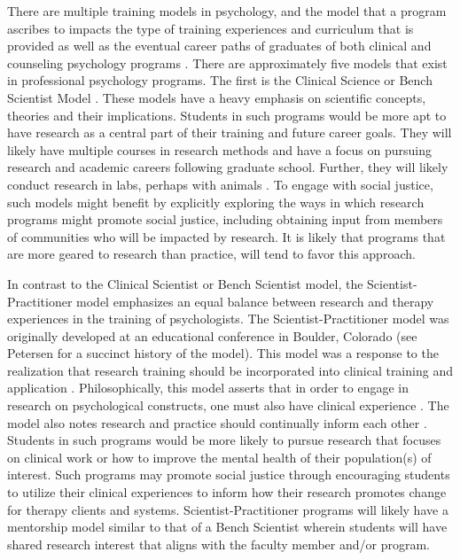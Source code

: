 \documentclass[
  11pt,
]{book}
\begin{document}
There are multiple training models in psychology, and the model that a program ascribes to impacts the type of training experiences and curriculum that is provided as well as the eventual career paths of graduates of both clinical \citep{cherry_examination_2000} and counseling psychology programs \citep{neimeyer_does_2005}. There are approximately five models that exist in professional psychology programs. The first is the Clinical Science or Bench Scientist Model \citep{deangelis_three_2003, university_of_arizona_clinical_psychology_program_program_2023}. These models have a heavy emphasis on scientific concepts, theories and their implications. Students in such programs would be more apt to have research as a central part of their training and future career goals. They will likely have multiple courses in research methods and have a focus on pursuing research and academic careers following graduate school. Further, they will likely conduct research in labs, perhaps with animals \citep{deangelis_three_2003}. To engage with social justice, such models might benefit by explicitly exploring the ways in which research programs might promote social justice, including obtaining input from members of communities who will be impacted by research. It is likely that programs that are more geared to research than practice, will tend to favor this approach.

In contrast to the Clinical Scientist or Bench Scientist model, the Scientist-Practitioner model emphasizes an equal balance between research and therapy experiences in the training of psychologists. The Scientist-Practitioner model was originally developed at an educational conference in Boulder, Colorado (see Petersen \citeyearpar{petersen_historical_2007} for a succinct history of the model). This model was a response to the realization that research training should be incorporated into clinical training and application \citep{jones_foundations_2007}. Philosophically, this model asserts that in order to engage in research on psychological constructs, one must also have clinical experience \citep{deangelis_three_2003}. The model also notes research and practice should continually inform each other \citep{jones_foundations_2007}. Students in such programs would be more likely to pursue research that focuses on clinical work or how to improve the mental health of their population(s) of interest. Such programs may promote social justice through encouraging students to utilize their clinical experiences to inform how their research promotes change for therapy clients and systems. Scientist-Practitioner programs will likely have a mentorship model similar to that of a Bench Scientist wherein students will have shared research interest that aligns with the faculty member and/or program.
\end{document}
